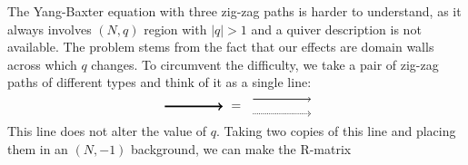 The Yang-Baxter equation with three zig-zag paths is harder to understand,
as it always involves $( N,q )$ region with $|q|>1$
and a quiver description is not available. The problem stems from
the fact that our effects are domain walls across which $q$ changes.
To circumvent the difficulty, we take a pair of zig-zag paths of different
types and think of it as a single line:
\begin{equation}
    \begin{tikzpicture}[scale=1, baseline=(x.base)]    \node (x) at (0,0) {\vphantom{x}};

        \draw[very thick, ->] (0,0) -- (1.6,0);

    \end{tikzpicture}
  \ = \
    \begin{tikzpicture}[scale=1, baseline=(x.base)]    \node (x) at (0,0) {\vphantom{x}};

        \draw[semithick, ->, yshift=0.2cm] (0,0) -- (1.6,0);
        \draw[semithick, densely dotted, ->, yshift=-0.2cm] (0,0) -- (1.6,0);

    \end{tikzpicture}
\end{equation}
This line does not alter the value of $q$. Taking two copies of
this line and placing them in an $( N,-1 )$ background,
we can make the R-matrix
